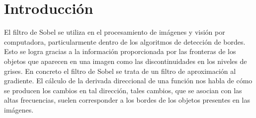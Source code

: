 \documentclass[10pt,journal,compsoc]{IEEEtran}
\begin{document}
%




\section{Introducción}

El filtro de Sobel se utiliza en el procesamiento de imágenes y visión por computadora, particularmente dentro de los algoritmos de detección de bordes. Esto se logra gracias a la información proporcionada por las fronteras de los objetos que  aparecen en una imagen como las discontinuidades en los niveles de grises. En concreto el filtro de Sobel se trata de un filtro de aproximación al gradiente. El cálculo de la derivada direccional de una función nos habla de cómo se producen los cambios en tal dirección, tales cambios, que se asocian con las altas frecuencias, suelen corresponder a los bordes de los objetos presentes en las imágenes\cite{SD_openCV}.
\end{document}
